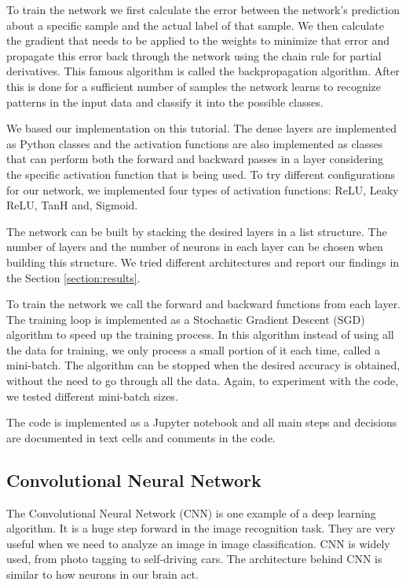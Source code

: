 \documentclass[conference]{IEEEtran}
\begin{document}
To train the network we first calculate the error between the network's prediction about a specific sample and the actual label of that sample. We then calculate the gradient that needs to be applied to the weights to minimize that error and propagate this error back through the network using the chain rule for partial derivatives. This famous algorithm is called the backpropagation algorithm. After this is done for a sufficient number of samples the network learns to recognize patterns in the input data and classify it into the possible classes.

We based our implementation on this tutorial\cite{mlpFromScratchTutorial}. The dense layers are implemented as Python classes and the activation functions are also implemented as classes that can perform both the forward and backward passes in a layer considering the specific activation function that is being used. To try different configurations for our network, we implemented four types of activation functions: ReLU, Leaky ReLU, TanH and, Sigmoid.

The network can be built by stacking the desired layers in a list structure. The number of layers and the number of neurons in each layer can be chosen when building this structure. We tried different architectures and report our findings in the Section \ref{section:results}.

To train the network we call the forward and backward functions from each layer. The training loop is implemented as a Stochastic Gradient Descent (SGD) algorithm to speed up the training process. In this algorithm instead of using all the data for training, we only process a small portion of it each time, called a mini-batch. The algorithm can be stopped when the desired accuracy is obtained, without the need to go through all the data. Again, to experiment with the code, we tested different mini-batch sizes.

The code is implemented as a Jupyter notebook and all main steps and decisions are documented in text cells and comments in the code.

\subsection{Convolutional Neural Network}

The Convolutional Neural Network (CNN) is one example of a deep learning algorithm. It is a huge step forward in the image recognition task. They are very useful when we need to analyze an image in image classification\cite{CNNnetwork}. CNN is widely used, from photo tagging to self-driving cars. The architecture behind CNN is similar to how neurons in our brain act\cite{CNNnetwork}.
\end{document}

